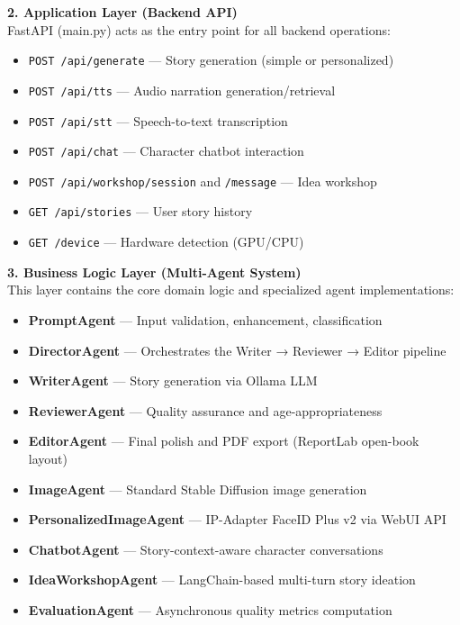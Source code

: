 \textbf{2. Application Layer (Backend API)} \\
FastAPI (main.py) acts as the entry point for all backend operations:
\begin{itemize}
    \item \texttt{POST /api/generate} — Story generation (simple or personalized)
    \item \texttt{POST /api/tts} — Audio narration generation/retrieval
    \item \texttt{POST /api/stt} — Speech-to-text transcription
    \item \texttt{POST /api/chat} — Character chatbot interaction
    \item \texttt{POST /api/workshop/session} and \texttt{/message} — Idea workshop
    \item \texttt{GET /api/stories} — User story history
    \item \texttt{GET /device} — Hardware detection (GPU/CPU)
\end{itemize}

\textbf{3. Business Logic Layer (Multi-Agent System)} \\
This layer contains the core domain logic and specialized agent implementations:
\begin{itemize}
    \item \textbf{PromptAgent} — Input validation, enhancement, classification
    \item \textbf{DirectorAgent} — Orchestrates the Writer → Reviewer → Editor pipeline
    \item \textbf{WriterAgent} — Story generation via Ollama LLM
    \item \textbf{ReviewerAgent} — Quality assurance and age-appropriateness
    \item \textbf{EditorAgent} — Final polish and PDF export (ReportLab open-book layout)
    \item \textbf{ImageAgent} — Standard Stable Diffusion image generation
    \item \textbf{PersonalizedImageAgent} — IP-Adapter FaceID Plus v2 via WebUI API
    \item \textbf{ChatbotAgent} — Story-context-aware character conversations
    \item \textbf{IdeaWorkshopAgent} — LangChain-based multi-turn story ideation
    \item \textbf{EvaluationAgent} — Asynchronous quality metrics computation
\end{itemize}

